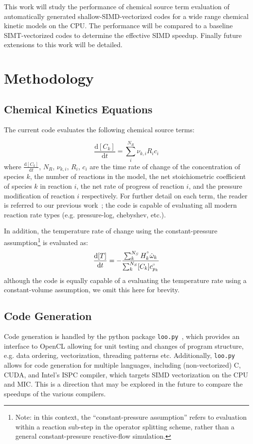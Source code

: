 \documentclass[12pt]{ussci}
\begin{document}
This work will study the performance of chemical source term evaluation of automatically generated shallow-SIMD-vectorized codes for a wide range chemical kinetic models on the CPU.
The performance will be compared to a baseline SIMT-vectorized codes to determine the effective SIMD speedup.
Finally future extensions to this work will be detailed.

\section{Methodology}
\subsection{Chemical Kinetics Equations}
The current code evaluates the following chemical source terms:

\begin{equation}
\frac{\text{d}[C_k]}{\text{d}t} = \sum_{i}^{N_R} \nu_{k,i} R_i c_i
\end{equation}
where $\frac{\text{d}[C_k]}{\text{d}t}$, $N_R$, $\nu_{k,i}$, ${R_i}$, $c_i$ are the time rate of change of the concentration of species $k$, the number of reactions in the model, the net stoichiometric coefficient of species $k$ in reaction $i$, the net rate of progress of reaction $i$, and the pressure modification of reaction $i$ respectively.
For further detail on each term, the reader is referred to our previous work~\cite{Niemeyer:2016aa}; the code is capable of evaluating all modern reaction rate types (e.g. pressure-log, chebyshev, etc.).

In addition, the temperature rate of change using the constant-pressure assumption\footnote{Note: in this context, the ``constant-pressure assumption'' refers to evaluation within a reaction sub-step in the operator splitting scheme, rather than a general constant-pressure reactive-flow simulation.} is evaluated as:
\begin{equation}
\frac{\text{d}[T]}{\text{d}t} = -\frac{\sum_{k}^{N_S} H^{\degree}_k \dot{\omega}_k}{\sum_{k}^{N_S} [C_k] c_{p_k}^{\degree}}
\end{equation}
although the code is equally capable of a evaluating the temperature rate using a constant-volume assumption, we omit this here for brevity.

\subsection{Code Generation}
Code generation is handled by the python package \texttt{loo.py}~\cite{kloeckner_loopy_2014}, which provides an interface to OpenCL allowing for unit testing and changes of program structure, e.g. data ordering, vectorization, threading patterns etc.
Additionally, \texttt{loo.py} allows for code generation for multiple languages, including (non-vectorized) C, CUDA, and Intel's ISPC compiler, which targets SIMD vectorization on the CPU and MIC.
This is a direction that may be explored in the future to compare the speedups of the various compilers.
\end{document}
